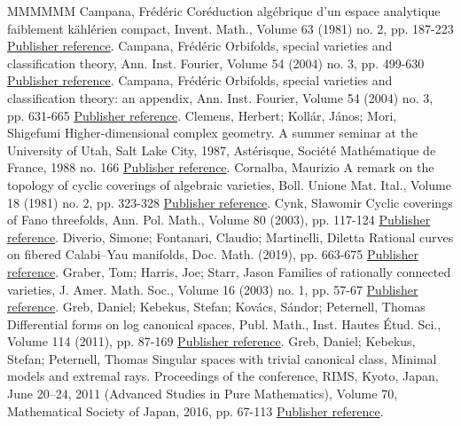 \begin{thebibliography}{MMMMMM}
 Campana, Frédéric Coréduction algébrique d’un espace analytique faiblement kählérien compact, Invent. Math., Volume 63 (1981) no. 2, pp. 187-223 \href{https://ahl.centre-mersenne.org/item/AHL_2020__3__473_0/#Ca81}{Publisher reference}.
 Campana, Frédéric Orbifolds, special varieties and classification theory, Ann. Inst. Fourier, Volume 54 (2004) no. 3, pp. 499-630 \href{https://ahl.centre-mersenne.org/item/AHL_2020__3__473_0/#Ca04a}{Publisher reference}.
 Campana, Frédéric Orbifolds, special varieties and classification theory: an appendix, Ann. Inst. Fourier, Volume 54 (2004) no. 3, pp. 631-665 \href{https://ahl.centre-mersenne.org/item/AHL_2020__3__473_0/#Ca04}{Publisher reference}.
 Clemens, Herbert; Kollár, János; Mori, Shigefumi Higher-dimensional complex geometry. A summer seminar at the University of Utah, Salt Lake City, 1987, Astérisque, Société Mathématique de France, 1988 no. 166 \href{https://ahl.centre-mersenne.org/item/AHL_2020__3__473_0/#CKL88}{Publisher reference}.
 Cornalba, Maurizio A remark on the topology of cyclic coverings of algebraic varieties, Boll. Unione Mat. Ital., Volume 18 (1981) no. 2, pp. 323-328 \href{https://ahl.centre-mersenne.org/item/AHL_2020__3__473_0/#Cor81}{Publisher reference}.
 Cynk, Sławomir Cyclic coverings of Fano threefolds, Ann. Pol. Math., Volume 80 (2003), pp. 117-124 \href{https://ahl.centre-mersenne.org/item/AHL_2020__3__473_0/#Cy03}{Publisher reference}.
 Diverio, Simone; Fontanari, Claudio; Martinelli, Diletta Rational curves on fibered Calabi–Yau manifolds, Doc. Math. (2019), pp. 663-675 \href{https://ahl.centre-mersenne.org/item/AHL_2020__3__473_0/#DFM16}{Publisher reference}.
 Graber, Tom; Harris, Joe; Starr, Jason Families of rationally connected varieties, J. Amer. Math. Soc., Volume 16 (2003) no. 1, pp. 57-67 \href{https://ahl.centre-mersenne.org/item/AHL_2020__3__473_0/#GHS03}{Publisher reference}.
 Greb, Daniel; Kebekus, Stefan; Kovács, Sándor; Peternell, Thomas Differential forms on log canonical spaces, Publ. Math., Inst. Hautes Étud. Sci., Volume 114 (2011), pp. 87-169 \href{https://ahl.centre-mersenne.org/item/AHL_2020__3__473_0/#GKKP11}{Publisher reference}.
 Greb, Daniel; Kebekus, Stefan; Peternell, Thomas Singular spaces with trivial canonical class, Minimal models and extremal rays. Proceedings of the conference, RIMS, Kyoto, Japan, June 20–24, 2011 (Advanced Studies in Pure Mathematics), Volume 70, Mathematical Society of Japan, 2016, pp. 67-113 \href{https://ahl.centre-mersenne.org/item/AHL_2020__3__473_0/#GKP16}{Publisher reference}.

\end{thebibliography}
